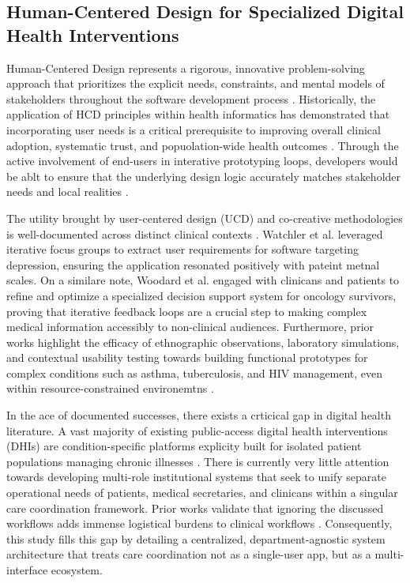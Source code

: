 \documentclass[manuscript, screen, review]{acmart}
\begin{document}
\subsection{Human-Centered Design for Specialized Digital Health Interventions}
\label{sub:hcd_digital_health}
Human-Centered Design represents a rigorous, innovative problem-solving approach that prioritizes the explicit needs, constraints, and mental models of stakeholders throughout the software development process \cite{leary_2022_an,wentzel_keeping_an_eye}. Historically, the application of HCD principles within health informatics has demonstrated that incorporating user needs is a critical prerequisite to improving overall clinical adoption, systematic trust, and popuolation-wide health outcomes \cite{leary_2022_an,oconnor_2016_understanding}. Through the active involvement of end-users in interative prototyping loops, developers would be ablt to ensure that the underlying design logic accurately matches stakeholder needs and local realities \cite{gttgens_2021_the,wentzel_keeping_an_eye}.

The utility brought by user-centered design (UCD) and co-creative methodologies is well-documented across distinct clinical contexts \cite{gttgens_2021_the}. Watchler et al.\cite{wachtler_2018_development} leveraged iterative focus groups to extract user requirements for software targeting depression, ensuring the application resonated positively with pateint metnal scales. On a similare note, Woodard et al. \cite{woodard_2018_the} engaged with clinicans and patients to refine and optimize a specialized decision support system for oncology survivors, proving that iterative feedback loops are a crucial step to making complex medical information accessibly to non-clinical audiences. Furthermore, prior works highlight the efficacy of ethnographic observations, laboratory simulations, and contextual usability testing towards building functional prototypes for complex conditions such as asthma, tuberculosis, and HIV management, even within resource-constrained environemtns \cite{catalani_2014_a,eberhart_2019_using,wentzel_keeping_an_eye}. 

In the ace of documented successes, there exists a crticical gap in digital health literature. A vast majority of existing public-access digital health interventions (DHIs) are condition-specific platforms explicity built for isolated patient populations managing chronic illnesses \cite{gttgens_2021_the,oconnor_2016_understanding}. There is currently very little attention towards developing multi-role institutional systems that seek to unify separate operational needs of patients, medical secretaries, and clinicans within a singular care coordination framework. Prior works validate that ignoring the discussed workflows adds immense logistical burdens to clinical workflows \cite{Chang682,wentzel_keeping_an_eye}. Consequently, this study fills this gap by detailing a centralized, department-agnostic system architecture that treats care coordination not as a single-user app, but as a multi-interface ecosystem. 
\end{document}
